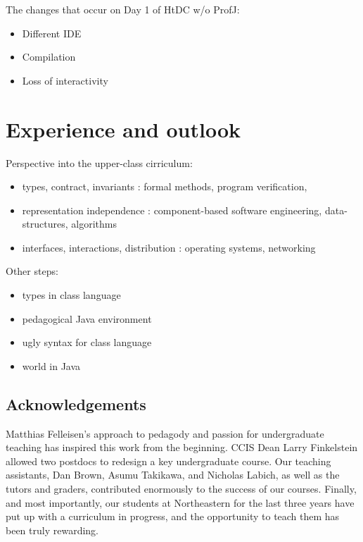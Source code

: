 \documentclass[submission,copyright]{eptcs}
\begin{document}
The changes that occur on Day 1 of HtDC w/o ProfJ:

\begin{itemize}
\item Different IDE
\item Compilation
\item Loss of interactivity
\end{itemize}

\section{Experience and outlook}

Perspective into the upper-class cirriculum:

\begin{itemize}
\item types, contract, invariants : formal methods, program verification,
  
\item representation independence : component-based software engineering,
  data-structures, algorithms

\item interfaces, interactions, distribution : operating systems, networking
\end{itemize}


Other steps:
\begin{itemize}
\item types in class language
\item pedagogical Java environment
\item ugly syntax for class language
\item world in Java
\end{itemize}

\cite{dvanhorn:sicp}

\cite{local:htdc}

\subsection*{Acknowledgements}

Matthias Felleisen's approach to pedagody and passion for
undergraduate teaching has inspired this work from the beginning.
CCIS Dean Larry Finkelstein allowed two postdocs to redesign a key
undergraduate course.  Our teaching assistants, Dan Brown, Asumu
Takikawa, and Nicholas Labich, as well as the tutors and graders,
contributed enormously to the success of our courses. Finally, and
most importantly, our students at Northeastern for the last three
years have put up with a curriculum in progress, and the opportunity
to teach them has been truly rewarding.



\end{document}
